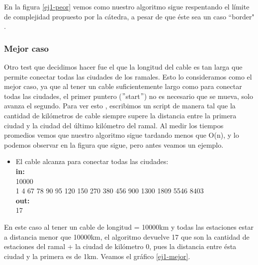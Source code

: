 En la figura \ref{ej1-peor} vemos como nuestro algoritmo sigue respentando el límite de complejidad propuesto por la cátedra, a pesar de que éste sea un caso ``border" $ $. \\

\subsubsection{Mejor caso}

Otro test que decidimos hacer fue el que la longitud del cable es tan larga que permite conectar todas las ciudades de los ramales. Esto lo consideramos como el mejor caso, ya que al tener un cable suficientemente largo como para conectar todas las ciudades, el primer puntero ($"$start$"$) no es necesario que se mueva, solo avanza el segundo. Para ver esto , escribimos un script de manera tal que la cantidad de kilómetros de cable siempre supere la distancia entre la primera ciudad y la ciudad del último kilómetro del ramal. Al medir los tiempos promedios vemos que nuestro algoritmo sigue tardando menos que O(n), y lo podemos observar en la figura que sigue, pero antes veamos un ejemplo. \\

\begin{itemize}
\item El cable alcanza para conectar todas las ciudades:\\
\textbf{in:}\\
10000\\
1 4 67 78 90 95 120 150 270 380 456 900 1300 1809 5546 8403\\
\textbf{out:}\\
17\\
\end{itemize}
En este caso al tener un cable de longitud = 10000km y todas las estaciones estar a distancia menor que 10000km, el algoritmo devuelve 17 que son la cantidad de estaciones del ramal + la ciudad de kilómetro 0, pues la distancia entre ésta ciudad y la primera es de 1km. Veamos el gráfico \ref{ej1-mejor}. \\

